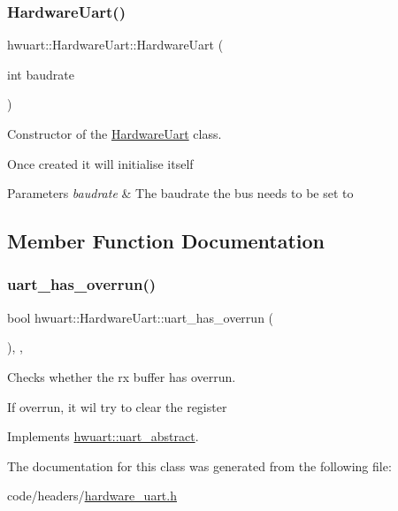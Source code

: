 \subsubsection{\texorpdfstring{Hardware\+Uart()}{HardwareUart()}}
{\footnotesize\ttfamily hwuart\+::\+Hardware\+Uart\+::\+Hardware\+Uart (\begin{DoxyParamCaption}\item[{int}]{baudrate }\end{DoxyParamCaption})\hspace{0.3cm}{\ttfamily [inline]}}



Constructor of the \hyperlink{classhwuart_1_1HardwareUart}{Hardware\+Uart} class. 

Once created it will initialise itself 
\begin{DoxyParams}{Parameters}
{\em baudrate} & The baudrate the bus needs to be set to \\
\hline
\end{DoxyParams}


\subsection{Member Function Documentation}
\mbox{\label{classhwuart_1_1HardwareUart_a718748c857525adb450fff2b37b3506c}} 
\subsubsection{\texorpdfstring{uart\+\_\+has\+\_\+overrun()}{uart\_has\_overrun()}}
{\footnotesize\ttfamily bool hwuart\+::\+Hardware\+Uart\+::uart\+\_\+has\+\_\+overrun (\begin{DoxyParamCaption}{ }\end{DoxyParamCaption})\hspace{0.3cm}{\ttfamily [inline]}, {\ttfamily [override]}, {\ttfamily [virtual]}}



Checks whether the rx buffer has overrun. 

If overrun, it wil try to clear the register 

Implements \hyperlink{classhwuart_1_1uart__abstract_a46106dfe7b7a87ad8541f15db8ca02f1}{hwuart\+::uart\+\_\+abstract}.



The documentation for this class was generated from the following file\+:\begin{DoxyCompactItemize}
\item 
code/headers/\hyperlink{hardware__uart_8h}{hardware\+\_\+uart.\+h}\end{DoxyCompactItemize}
